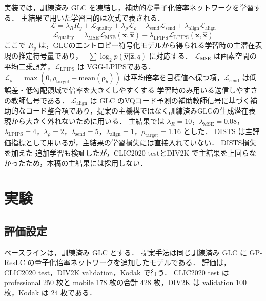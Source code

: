 \documentclass[MIRU,submit]{miru2026j}
\begin{document}
実装では，訓練済み GLC\cite{jia2024} を凍結し，補助的な量子化倍率ネットワークを学習する．
主結果で用いた学習目的は次式で表される．
\begin{equation}
\mathcal{L}
= \lambda_R R_y
+ \mathcal{L}_{\mathrm{quality}}
+ \lambda_\rho \mathcal{L}_\rho
+ \lambda_{\mathrm{send}}\mathcal{L}_{\mathrm{send}}
+ \lambda_{\mathrm{align}}\mathcal{L}_{\mathrm{align}}
\end{equation}
\begin{equation}
\mathcal{L}_{\mathrm{quality}}
= \lambda_{\mathrm{MSE}}\mathcal{L}_{\mathrm{MSE}}(\mathbf{x},\hat{\mathbf{x}})
+ \lambda_{\mathrm{LPIPS}}\mathcal{L}_{\mathrm{LPIPS}}(\mathbf{x},\hat{\mathbf{x}})
\end{equation}
ここで $R_y$ は，GLCのエントロピー符号化モデルから得られる学習時の主潜在表現の推定符号量であり，$-\sum \log_2 p(\hat{\mathbf{y}}|\hat{\mathbf{z}},q)$ に対応する．
$\mathcal{L}_{\mathrm{MSE}}$ は画素空間の平均二乗誤差，$\mathcal{L}_{\mathrm{LPIPS}}$ は VGG-LPIPS\cite{zhang2018}である．
$\mathcal{L}_{\rho}=\max(0,\rho_{\mathrm{target}}-\mathrm{mean}(\boldsymbol{\rho}_\theta))$ は平均倍率を目標値へ保つ項，$\mathcal{L}_{\mathrm{send}}$ は低誤差・低勾配領域で倍率を大きくしやすくする 学習時のみ用いる送信しやすさの教師信号である．
$\mathcal{L}_{\mathrm{align}}$ は GLC のVQコード予測の補助教師信号に基づく補助的なコード整合項であり，提案の主機構ではなく訓練済みGLCの生成潜在表現から大きく外れないために用いる．
主結果では $\lambda_R=10$，$\lambda_{\mathrm{MSE}}=0.08$，$\lambda_{\mathrm{LPIPS}}=4$，$\lambda_\rho=2$，$\lambda_{\mathrm{send}}=5$，$\lambda_{\mathrm{align}}=1$，$\rho_{\mathrm{target}}=1.16$ とした．
DISTS\cite{ding2022} は主評価指標として用いるが，主結果の学習損失には直接入れていない．
DISTS損失を加えた 追加学習も検証したが，CLIC2020 testとDIV2K で主結果を上回らなかったため，本稿の主結果には採用しない．

\section{実験}
\subsection{評価設定}
ベースラインは，訓練済み GLC\cite{jia2024} とする．
提案手法は同じ訓練済み GLC に GP-ResLC の量子化倍率ネットワークを追加したモデルである．
評価は，CLIC2020 test\cite{clic2020}，DIV2K validation\cite{agustsson2017}，Kodak\cite{kodak} で行う．
CLIC2020 test は professional 250 枚と mobile 178 枚の合計 428 枚，DIV2K は validation 100 枚，Kodak は 24 枚である．
\end{document}
